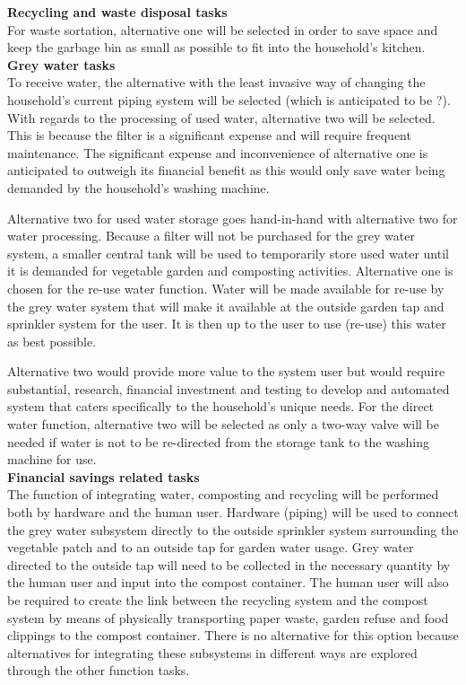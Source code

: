 \documentclass[a4paper,11pt,fleqn]{report}
\begin{document}
\textbf{Recycling and waste disposal tasks}\\
For waste sortation, alternative one will be selected in order to save space and keep the garbage bin as small as possible to fit into the household's kitchen.\\

\textbf{Grey water tasks}\\
To receive water, the alternative with the least invasive way of changing the household's current piping system will be selected (which is anticipated to be ?). With regards to the processing of used water, alternative two will be selected. This is because the filter is a significant expense and will require frequent maintenance. The significant expense and inconvenience of alternative one is anticipated to outweigh its financial benefit as this would only save water being demanded by the household's washing machine.

Alternative two for used water storage goes hand-in-hand with alternative two for water processing. Because a filter will not be purchased for the grey water system, a smaller central tank will be used to temporarily store used water until it is demanded for vegetable garden and composting activities. Alternative one is chosen for the re-use water function. Water will be made available for re-use by the grey water system that will make it available at the outside garden tap and sprinkler system for the user. It is then up to the user to use (re-use) this water as best possible.

Alternative two would provide more value to the system user but would require substantial, research, financial investment and testing to develop and automated system that caters specifically to the household's unique needs. For the direct water function, alternative two will be selected as only a two-way valve will be needed if water is not to be re-directed from the storage tank to the washing machine for use.\\

\textbf{Financial savings related tasks}\\
The function of integrating water, composting and recycling will be performed both by hardware and the human user. Hardware (piping) will be used to connect the grey water subsystem directly to the outside sprinkler system surrounding the vegetable patch and to an outside tap for garden water usage. Grey water directed to the outside tap will need to be collected in the necessary quantity by the human user and input into the compost container. The human user will also be required to create the link between the recycling system and the compost system by means of physically transporting paper waste, garden refuse and food clippings to the compost container. There is no alternative for this option because alternatives for integrating these subsystems in different ways are explored through the other function tasks.
\end{document}
